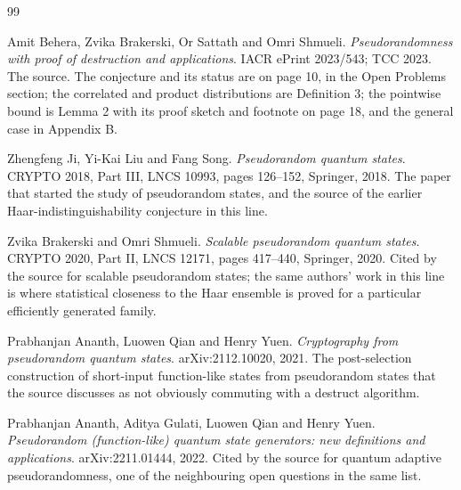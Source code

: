\documentclass{conjura-conjecture}
\begin{document}
\begin{conjurabibliography}{99}

Amit Behera, Zvika Brakerski, Or Sattath and Omri Shmueli.
\emph{Pseudorandomness with proof of destruction and applications}.
IACR ePrint 2023/543; TCC 2023.
The source. The conjecture and its status are on page 10, in the Open
Problems section; the correlated and product distributions are
Definition 3; the pointwise bound is Lemma 2 with its proof sketch and
footnote on page 18, and the general case in Appendix B.

Zhengfeng Ji, Yi-Kai Liu and Fang Song.
\emph{Pseudorandom quantum states}.
CRYPTO 2018, Part III, LNCS 10993, pages 126--152, Springer, 2018.
The paper that started the study of pseudorandom states, and the source
of the earlier Haar-indistinguishability conjecture in this line.

Zvika Brakerski and Omri Shmueli.
\emph{Scalable pseudorandom quantum states}.
CRYPTO 2020, Part II, LNCS 12171, pages 417--440, Springer, 2020.
Cited by the source for scalable pseudorandom states; the same authors'
work in this line is where statistical closeness to the Haar ensemble is
proved for a particular efficiently generated family.

Prabhanjan Ananth, Luowen Qian and Henry Yuen.
\emph{Cryptography from pseudorandom quantum states}.
arXiv:2112.10020, 2021.
The post-selection construction of short-input function-like states from
pseudorandom states that the source discusses as not obviously commuting
with a destruct algorithm.

Prabhanjan Ananth, Aditya Gulati, Luowen Qian and Henry Yuen.
\emph{Pseudorandom (function-like) quantum state generators: new
definitions and applications}.
arXiv:2211.01444, 2022.
Cited by the source for quantum adaptive pseudorandomness, one of the
neighbouring open questions in the same list.

\end{conjurabibliography}
\end{document}
